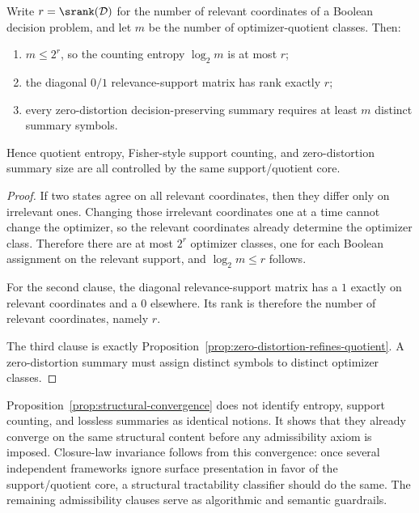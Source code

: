\begin{proposition}\label{prop:structural-convergence}
Write $r=\srank(\mathcal{D})$ for the number of relevant coordinates of a Boolean decision problem, and let $m$ be the number of optimizer-quotient classes. Then:
\begin{enumerate}
\item $m \le 2^r$, so the counting entropy $\log_2 m$ is at most $r$;
\item the diagonal $0/1$ relevance-support matrix has rank exactly $r$;
\item every zero-distortion decision-preserving summary requires at least $m$ distinct summary symbols.
\end{enumerate}
Hence quotient entropy, Fisher-style support counting, and zero-distortion summary size are all controlled by the same support/quotient core.
\end{proposition}

\begin{proof}
If two states agree on all relevant coordinates, then they differ only on irrelevant ones. Changing those irrelevant coordinates one at a time cannot change the optimizer, so the relevant coordinates already determine the optimizer class. Therefore there are at most $2^r$ optimizer classes, one for each Boolean assignment on the relevant support, and $\log_2 m \le r$ follows.

For the second clause, the diagonal relevance-support matrix has a $1$ exactly on relevant coordinates and a $0$ elsewhere. Its rank is therefore the number of relevant coordinates, namely $r$.

The third clause is exactly Proposition~\ref{prop:zero-distortion-refines-quotient}. A zero-distortion summary must assign distinct symbols to distinct optimizer classes.
\end{proof}

Proposition~\ref{prop:structural-convergence} does not identify entropy, support counting, and lossless summaries as identical notions. It shows that they already converge on the same structural content before any admissibility axiom is imposed. Closure-law invariance follows from this convergence: once several independent frameworks ignore surface presentation in favor of the support/quotient core, a structural tractability classifier should do the same. The remaining admissibility clauses serve as algorithmic and semantic guardrails.

